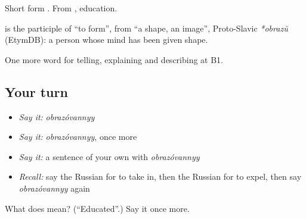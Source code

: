 Short form \emph{}. From \emph{}, education.

\begin{cousinweb}
\textbf{} is the participle of \emph{} \textquotedblleft{}to form\textquotedblright{}, from \emph{} \textquotedblleft{}a shape, an image\textquotedblright{}, Proto-Slavic \emph{*obrazŭ} (EtymDB): a person whose mind has been given shape.
\end{cousinweb}

\begin{grammarlens}[title={What you've built}]
One more word for telling, explaining and describing at B1.
\end{grammarlens}

\subsection*{Your turn}
\begin{itemize}
\raggedright
  \item \emph{Say it:} \emph{obrazóvannyy}
  \item \emph{Say it:} \emph{obrazóvannyy}, once more
  \item \emph{Say it:} a sentence of your own with \emph{obrazóvannyy}
  \item \emph{Recall:} say the Russian for to take in, then the Russian for to expel, then say \emph{obrazóvannyy} again
\end{itemize}

\begin{tcolorbox}[breakable,colback=teal!4,colframe=teal!35!black,title={Before you move on}]
What does  mean? (\textquotedblleft{}Educated\textquotedblright{}.) Say it once more.
\end{tcolorbox}
